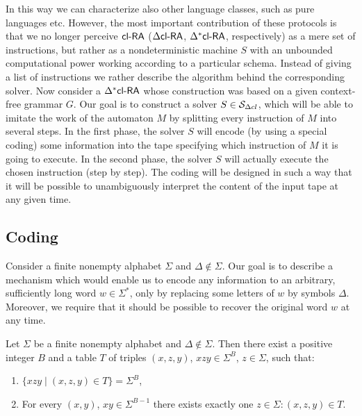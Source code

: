In this way we can characterize also other language classes, such as pure languages \cite{maurer1980pure} etc. However, the most important contribution of these protocols is that we no longer perceive $\textup{\sf cl-RA\/}$ ($\textup{\sf $\Delta$cl-RA\/}$, $\textup{\sf $\Delta^*$cl-RA\/}$, respectively) as a mere set of instructions, but rather as a nondeterministic machine $S$ with an unbounded computational power working according to a particular schema. Instead of giving a list of instructions we rather describe the algorithm behind the corresponding solver. Now consider a $\textup{\sf $\Delta^*$cl-RA\/}$ whose construction was based on a given context-free grammar $G$. Our goal is to construct a solver $S \in \mathcal{S}_{\Delta cl}$, which will be able to imitate the work of the automaton $M$ by splitting every instruction of $M$ into several steps. In the first phase, the solver $S$ will encode (by using a special coding) some information into the tape specifying which instruction of $M$ it is going to execute. In the second phase, the solver $S$ will actually execute the chosen instruction (step by step). The coding will be designed in such a way that it will be possible to unambiguously interpret the content of the input tape at any given time.

\subsection{Coding}\label{section:dxclra_coding}

Consider a finite nonempty alphabet $\Sigma$ and $\Delta \notin \Sigma$. Our goal is to describe a mechanism which would enable us to encode any information to an arbitrary, sufficiently long word $w \in \Sigma^*$, only by replacing some letters of $w$ by symbols $\Delta$. Moreover, we require that it should be possible to recover the original word $w$ at any time.

\begin{theorem}[Coding 1]\label{theorem:dxclra_coding_1}
Let $\Sigma$ be a finite nonempty alphabet and $\Delta \notin \Sigma$. Then there exist a positive integer $B$ and a table $T$ of triples $(x, z, y)$, $xzy \in \Sigma^B$, $z \in \Sigma$, such that:
\begin{enumerate}
\item\label{theorem:dxclra_coding_1:a} $\{ xzy \mid (x, z, y) \in T \} = \Sigma^B$,
\item\label{theorem:dxclra_coding_1:b} For every $(x, y)$, $xy \in \Sigma^{B-1}$ there exists exactly one $z \in \Sigma: (x, z, y) \in T$.
\end{enumerate}
\end{theorem}

